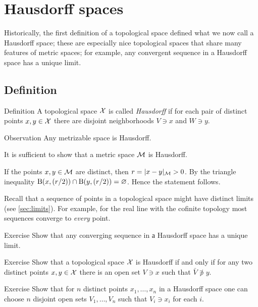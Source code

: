 \chapter{Hausdorff spaces}\label{chap:hausdorff}


Historically, the first definition of a topological space \cite[VII § 1]{hausdorff1914} defined what we now call a Hausdorff space; these are especially nice topological spaces that share many features of metric spaces;
for example, any convergent sequence in a Hausdorff space has a unique limit.

\section{Definition}

\begin{thm}{Definition}\label{def:hausdorff}
A topological space $\mathcal{X}$ is called \emph{Hausdorff} if for each pair of distinct points
$x, y \in \mathcal{X}$ there are disjoint neighborhoods $V\ni x$ and $W\ni y$.
\end{thm}

\begin{thm}{Observation}
Any metrizable space is Hausdorff.
\end{thm}

It is sufficient to show that a metric space $\mathcal{M}$ is Hausdorff.

If the points $x,y\in\mathcal{M}$ are distinct, then $r=|x-y|_{\mathcal{M}}>0$.
By the triangle inequality
$\mathrm{B}(x,(r/2))\cap \mathrm{B}(y,(r/2))=\varnothing$.
Hence the statement follows.
\qeds

Recall that a sequence of points in a topological space might have distinct limits (see \ref{sec:limits}).
For example, for the real line with the cofinite topology most sequences converge to \textit{every} point.

\begin{thm}{Exercise}\label{ex:hausdorff-unique-limit}
Show that any converging sequence in а Hausdorff space has a unique limit.
\end{thm}

\begin{thm}{Exercise}\label{ex:hausdorff-closure}
Show that a topological space $\mathcal{X}$ is Hausdorff
if and only if for any two distinct points $x,y\in \mathcal{X}$ there is an open set $V\ni x$ such that $\bar V\not\ni y$.
\end{thm}

\begin{thm}{Exercise}\label{ex:hausdorff-n-points}
Show that for $n$ distinct points $x_1,\ldots,x_n$ in a Hausdorff space one can choose $n$ disjoint open sets $V_1,\dots,V_n$ such that $V_i\ni x_i$ for each $i$.
\end{thm}


